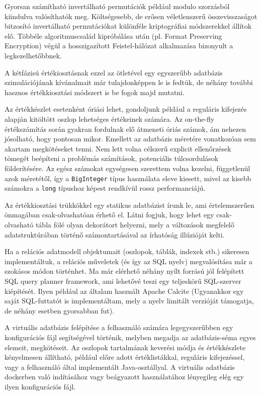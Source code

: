 \documentclass[
    parspace,
    noindent,
    nohyp,
]{elteiktdk}[2023/04/10]
\begin{document}
Gyorsan számítható invertálható permutációk például modulo szorzásból kiindulva valósíthatók meg.
Költségesebb, de erősen véletlenszerű összevisszaságot bitzosító invertálható permutációkat
különféle kriptográfiai módszerekkel állítok elő.
Többéle algoritmuscsalád kipróbálása után (pl. Format Preserving Encryption) végül
a hosszigazított Feistel-hálózat alkalmazása bizonyult a legkezelhetőbbnek.

A kétfázisú értékiosztásnak ezzel az ötletével
egy egyszerűbb adatbázis szimulációjának kívánalmait már tulajdonképpen le is fedtük,
de néhány további hasznos értékkiosztási módszert is be fogok majd mutatni.

Az értékkészlet esetenként óriási lehet,
gondoljunk például a reguláris kifejezés alapján kitöltött oszlop lehetséges értékeinek számára.
Az on-the-fly értékszámítás során gyakran fordulnak elő átmeneti óriás számok,
ám nehezen jósolható, hogy pontosan mikor.
Emellett az adatbázis méretére vonatkozóan sem akartam megkötéseket tenni.
Nem lett volna célszerű explicit ellenőrzések tömegét beépíteni
a problémás számítások, potenciális túlcsordulások földerítésére.
Az egész számokat egységesen szerettem volna kezelni, függetlenül azok méretétől,
így a \texttt{BigInteger} típus használata eleve kiesett,
mivel az kisebb számokra a \texttt{long} típushoz képest rendkívül rossz performanciájú.

Az értékkiosztási trükkökkel egy statikus adatbázist írunk le,
ami értelemszerűen önmagában csak-olvashatóan érhető el.
Látni fogjuk, hogy lehet egy csak-olvasható tábla fölé olyan dekorátort helyezni,
mely a változások megfelelő adatstruktúrában történő számontartásával
az írhatóság illúzióját kelti.

Ha a relációs adatmodell objektumait (oszlopok, táblák, indexek stb.) sikeresen implementáltuk,
a relációs műveletek (és így az SQL nyelv) megvalósítása már a szokásos módon történhet.
Ma már elérhető néhány nyílt forrású jól felépített SQL query planner framework,
ami lehetővé teszi egy teljeskörű SQL-szerver kiépítését.
Ilyen például az általam használt Apache Calcite
(Ugyanakkor egy saját SQL-futtatót is implementáltam,
mely a nyelv limitált verzióját támogatja, de néhány esetben gyorsabban fut).

A virtuális adatbázis felépítése a felhasználó számára legegyszerűbben
egy konfigurációs fájl segítségével történik,
melyben megadja az adatbázis-séma egyes elemeit, megkötéseit.
Az oszlopok tartalmának keverési módja és értékkészlete kényelmesen állítható,
például előre adott értéklistákkal, reguláris kifejezéssel,
vagy a felhasználó által implementált Java-osztállyal.
A virtuális adatbázis dockerben való indításához vagy beágyazott használatához
lényegileg elég egy ilyen konfigurációs fájl.
\end{document}
